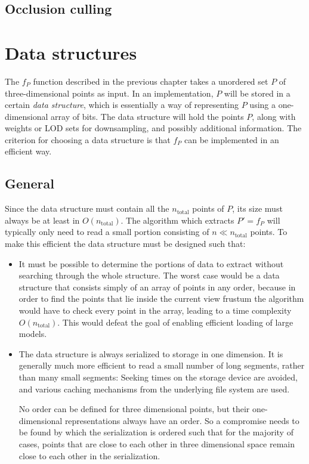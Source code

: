 \documentclass[a4paper,10pt,abstracton,notitlepage]{scrreprt}
\begin{document}
\section{Occlusion culling}


\chapter{Data structures}
The $f_{P}$ function described in the previous chapter takes a unordered set $P$ of three-dimensional points as input. In an implementation, $P$ will be stored in a certain \emph{data structure}, which is essentially a way of representing $P$ using a one-dimensional array of bits. The data structure will hold the points $P$, along with weights or LOD sets for downsampling, and possibly additional information. The criterion for choosing a data structure is that $f_{P}$ can be implemented in an efficient way.

\section{General}
Since the data structure must contain all the $n_{\text{total}}$ points of $P$, its size must always be at least in $O(n_{\text{total}})$. The algorithm which extracts $P' = f_{P}$ will typically only need to read a small portion consisting of $n \ll n_{\text{total}}$ points. To make this efficient the data structure must be designed such that:
\begin{itemize}
\item It must be possible to determine the portions of data to extract without searching through the whole structure. The worst case would be a data structure that consists simply of an array of points in any order, because in order to find the points that lie inside the current view frustum the algorithm would have to check every point in the array, leading to a time complexity $O(n_{\text{total}})$. This would defeat the goal of enabling efficient loading of large models.
\item The data structure is always serialized to storage in one dimension. It is generally much more efficient to read a small number of long segments, rather than many small segments: Seeking times on the storage device are avoided, and various caching mechanisms from the underlying file system are used.

No order can be defined for three dimensional points, but their one-dimensional representations always have an order. So a compromise needs to be found by which the serialization is ordered such that for the majority of cases, points that are close to each other in three dimensional space remain close to each other in the serialization.
\end{itemize}
\end{document}
